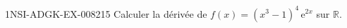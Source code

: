 \begin{exercice}{1NSI-ADGK-EX-008}{2}{15}
Calculer la dérivée de $f(x) = (x^3 - 1)^4 \, \mathrm{e}^{2x}$ sur $\mathbb{R}$.

\end{exercice}
